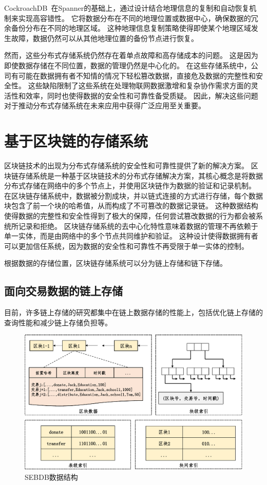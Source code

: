 CockroachDB~\cite{taft2020cockroachdb}在Spanner的基础上，通过设计结合地理信息的复制和自动恢复机制来实现高容错性。
它将数据分布在不同的地理位置或数据中心，确保数据的冗余备份分布在不同的地理区域。
这种地理信息复制策略使得即使某个地理区域发生故障，数据仍然可以从其他地理位置的备份节点进行恢复。

然而，这些分布式存储系统仍然存在着单点故障和高存储成本的问题。
这是因为即使数据存储在不同位置，数据的管理仍然是中心化的。
在这些存储系统中，公司有可能在数据拥有者不知情的情况下轻松篡改数据，直接危及数据的完整性和安全性。
这些缺陷限制了这些系统在处理物联网数据激增和复杂协作需求方面的灵活性和效率，同时也使得数据的安全性和可靠性备受质疑。
因此，解决这些问题对于推动分布式存储系统在未来应用中获得广泛应用至关重要。

\section{基于区块链的存储系统}
区块链技术的出现为分布式存储系统的安全性和可靠性提供了新的解决方案。
区块链存储系统是一种基于区块链技术的分布式存储解决方案，其核心概念是将数据分布式存储在网络中的多个节点上，并使用区块链作为数据的验证和记录机制。
在区块链存储系统中，数据被分割成块，并以链式连接的方式进行存储，每个数据块包含了前一个块的哈希值，从而构成了不可篡改的数据记录链。
这种数据结构使得数据的完整性和安全性得到了极大的保障，任何尝试篡改数据的行为都会被系统所记录和拒绝。
区块链存储系统的去中心化特性意味着数据的管理不再依赖于单一实体，而是由网络中的多个节点共同维护和验证。
这种设计使得数据拥有者可以更加信任系统，因为数据的安全性和可靠性不再受限于单一实体的控制。

根据数据的存储位置，区块链存储系统可以分为链上存储和链下存储。

\subsection{面向交易数据的链上存储}
目前，许多链上存储的研究都集中在链上数据存储的性能上，包括优化链上存储的查询性能和减少链上存储负担等。

\begin{figure}[t]
    \centering
    \includegraphics[width=1\linewidth]{figures/timechain/sebdb.pdf}
    \caption{SEBDB数据结构}
    \label{fig:sebdb}
\end{figure}


